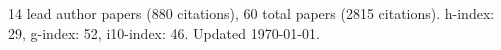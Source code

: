 14 lead author papers (880 citations),
60 total papers (2815 citations).\newline
h-index: 29, g-index: 52, i10-index: 46. Updated \today.